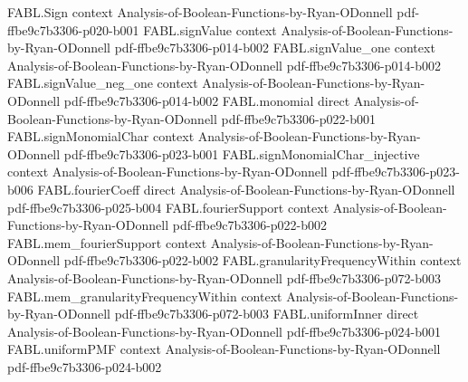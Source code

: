 \begin{theorem}
\label{FABL.FiniteFourierBasis.orthogonalComponent_eq_mobius}
\leanok
{}
\proofstep
  {FABL.Sign}
  {context}
  {Analysis-of-Boolean-Functions-by-Ryan-ODonnell}
  {pdf-ffbe9c7b3306-p020-b001}
\proofstep
  {FABL.signValue}
  {context}
  {Analysis-of-Boolean-Functions-by-Ryan-ODonnell}
  {pdf-ffbe9c7b3306-p014-b002}
\proofstep
  {FABL.signValue_one}
  {context}
  {Analysis-of-Boolean-Functions-by-Ryan-ODonnell}
  {pdf-ffbe9c7b3306-p014-b002}
\proofstep
  {FABL.signValue_neg_one}
  {context}
  {Analysis-of-Boolean-Functions-by-Ryan-ODonnell}
  {pdf-ffbe9c7b3306-p014-b002}
\proofstep
  {FABL.monomial}
  {direct}
  {Analysis-of-Boolean-Functions-by-Ryan-ODonnell}
  {pdf-ffbe9c7b3306-p022-b001}
\proofstep
  {FABL.signMonomialChar}
  {context}
  {Analysis-of-Boolean-Functions-by-Ryan-ODonnell}
  {pdf-ffbe9c7b3306-p023-b001}
\proofstep
  {FABL.signMonomialChar_injective}
  {context}
  {Analysis-of-Boolean-Functions-by-Ryan-ODonnell}
  {pdf-ffbe9c7b3306-p023-b006}
\proofstep
  {FABL.fourierCoeff}
  {direct}
  {Analysis-of-Boolean-Functions-by-Ryan-ODonnell}
  {pdf-ffbe9c7b3306-p025-b004}
\proofstep
  {FABL.fourierSupport}
  {context}
  {Analysis-of-Boolean-Functions-by-Ryan-ODonnell}
  {pdf-ffbe9c7b3306-p022-b002}
\proofstep
  {FABL.mem_fourierSupport}
  {context}
  {Analysis-of-Boolean-Functions-by-Ryan-ODonnell}
  {pdf-ffbe9c7b3306-p022-b002}
\proofstep
  {FABL.granularityFrequencyWithin}
  {context}
  {Analysis-of-Boolean-Functions-by-Ryan-ODonnell}
  {pdf-ffbe9c7b3306-p072-b003}
\proofstep
  {FABL.mem_granularityFrequencyWithin}
  {context}
  {Analysis-of-Boolean-Functions-by-Ryan-ODonnell}
  {pdf-ffbe9c7b3306-p072-b003}
\proofstep
  {FABL.uniformInner}
  {direct}
  {Analysis-of-Boolean-Functions-by-Ryan-ODonnell}
  {pdf-ffbe9c7b3306-p024-b001}
\proofstep
  {FABL.uniformPMF}
  {context}
  {Analysis-of-Boolean-Functions-by-Ryan-ODonnell}
  {pdf-ffbe9c7b3306-p024-b002}

\end{theorem}
